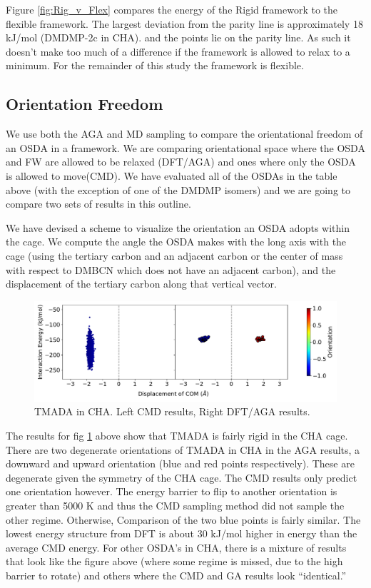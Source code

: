 \documentclass[journal=accacs,manuscript=article, email=true, layout=traditional]{achemso}
\begin{document}
Figure \ref{fig:Rig_v_Flex} compares the energy of the Rigid framework to the flexible framework. The largest deviation from the parity line is approximately 18 kJ/mol (DMDMP-2c in CHA). and the points lie on the parity line. As such it doesn't make too much of a difference if the framework is allowed to relax to a minimum. For the remainder of this study the framework is flexible.

\subsection{Orientation Freedom}
\label{sec:org0af9903}
We use both the AGA and MD sampling to compare the orientational freedom of an OSDA in a framework. We are comparing orientational space where the OSDA and FW are allowed to be relaxed (DFT/AGA) and ones where only the OSDA is allowed to move(CMD). We have evaluated all of the OSDAs in the table above (with the exception of one of the DMDMP isomers) and we are going to compare two sets of results in this outline. 

We have devised a scheme to visualize the orientation an OSDA adopts within the cage. We compute the angle the OSDA makes with the long axis with the cage (using the tertiary carbon and an adjacent carbon or the center of mass with respect to DMBCN which does not have an adjacent carbon), and the displacement of the tertiary carbon along that vertical vector. 

\begin{figure}
\begin{center}

\includegraphics[scale=.5]{./Figures/CHA-GA-CMD-TMADA.pdf}
\caption{TMADA in CHA. Left CMD results, Right DFT/AGA results.} 
\label{fig:TMADA-CHA} 

\end{center}
\end{figure}

The results for fig \ref{fig:TMADA-CHA} above show that TMADA is fairly rigid in the CHA cage. There are two degenerate orientations of TMADA in CHA in the AGA results, a downward and upward orientation (blue and red points respectively). These are degenerate given the symmetry of the CHA cage. The CMD results only predict one orientation however. The energy barrier to flip to another orientation is greater than 5000 K and thus the CMD sampling method did not sample the other regime. Otherwise, Comparison of the two blue points is fairly similar. The lowest energy structure from DFT is about 30 kJ/mol higher in energy than the average CMD energy. For other OSDA's in CHA, there is a mixture of results that look like the figure above (where some regime is missed, due to the high barrier to rotate) and others where the CMD and GA results look ``identical.''
\end{document}
